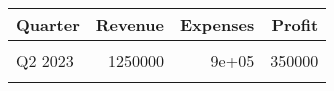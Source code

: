\documentclass{article}
\begin{document}
\thispagestyle{empty}

\begin{table}
\centering
\begin{tabular}{lrrr}
\toprule
\textbf{Quarter} & \textbf{Revenue} & \textbf{Expenses} & \textbf{Profit}\\
\midrule
\cellcolor{red!10}{Q1 2023} & \cellcolor{red!10}{1000000} & \cellcolor{red!10}{8e+05} & \cellcolor{red!10}{200000}\\
Q2 2023 & 1250000 & 9e+05 & 350000\\
\cellcolor{red!10}{Q3 2023} & \cellcolor{red!10}{1500000} & \cellcolor{red!10}{1e+06} & \cellcolor{red!10}{500000}\\
\bottomrule
\end{tabular}
\end{table}
\end{document}
